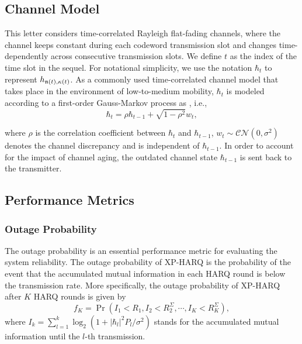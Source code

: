 \documentclass[lettersize,journal]{IEEEtran}
\begin{document}
\subsection{Channel Model}
This letter considers time-correlated Rayleigh flat-fading channels, where the channel keeps constant during each codeword transmission slot and changes time-dependently across consecutive transmission slots. We define $t$ as the index of the time slot in the sequel. %
For notational simplicity, we use the notation $\hbar _{t} $ to represent $ h_{\frak{n}(t),\kappa(t)} $. %
 As a commonly used time-correlated channel model that takes place in the environment of low-to-medium mobility, $ \hbar_{t} $ is modeled according to a first-order Gauss-Markov process as \cite{5710995}, i.e., %
\begin{equation}\label{eqn:state transition}
    {\hbar}_{t}=\rho {\hbar}_{t-1}+\sqrt{1-\rho^{2}} {w}_t,
\end{equation}

where ${\rho}$ is the correlation coefficient between ${\hbar}_{t}$ and ${\hbar}_{t-1}$, ${w}_t \sim \mathcal{C N}\left({0}, \sigma^{2} \right)$ denotes the channel discrepancy and is independent of ${\hbar_{t-1}}$. In order to account for the impact of channel aging, the outdated channel state ${\hbar}_{t-1}$ is sent back to the transmitter.

\subsection{Performance Metrics}
\subsubsection{Outage Probability}
The outage probability is an essential performance metric for evaluating the system reliability. The outage probability of XP-HARQ is the probability of the event that the accumulated mutual information in each HARQ round is below the transmission rate. More specifically, the outage probability of XP-HARQ after $K$ HARQ rounds is given by \cite{jabi2017adaptive}
\begin{equation}\label{eq:out}
    f_K = \Pr\left(I_1<R_1,I_2 < R_2^\Sigma,\cdots,I_K < R_K^\Sigma\right),
\end{equation}
where ${I_k} = \sum_{l=1}^k{\log _2}(1 + |{\hbar_l}{|^2}{{{P_l}} {/{{\sigma ^2}}}})$ stands for the accumulated mutual information until the $l$-th transmission.
\end{document}
